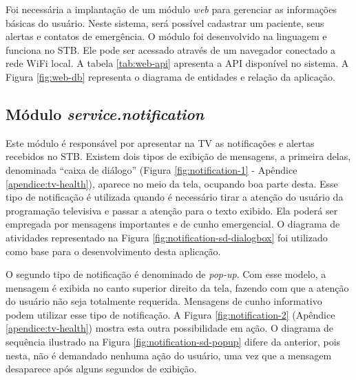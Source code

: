 Foi necessária a implantação de um módulo \textit{web} para gerenciar as 
informações básicas do usuário. Neste sistema, será possível cadastrar um 
paciente, seus alertas e contatos de emergência. O módulo \web[] foi desenvolvido
na linguagem \python[] e funciona no STB. Ele pode ser acessado através de
um navegador conectado a rede WiFi local. A tabela \ref{tab:web-api} apresenta
a API disponível no sistema. A Figura \vref{fig:web-db} representa o diagrama
de entidades e relação da aplicação.


\subsection{Módulo \textit{service.notification}}\label{subsubsec:notification}

Este módulo é responsável por apresentar na TV as notificações e alertas
recebidos no STB. Existem dois tipos de exibição de mensagens, a primeira
delas, denominada ``caixa de diálogo'' (Figura \vref{fig:notification-1} -
Apêndice \ref{apendice:tv-health}), aparece no meio da tela, ocupando boa parte
desta.  Esse tipo de notificação é utilizada quando é necessário tirar a
atenção do usuário da programação televisiva e passar a atenção para o texto
exibido.  Ela poderá ser empregada por mensagens importantes e de cunho
emergencial.  O diagrama de atividades representado na Figura
\ref{fig:notification-sd-dialogbox} foi utilizado como base para o
desenvolvimento desta aplicação.



O segundo tipo de notificação é denominado de \textit{pop-up}. Com esse modelo,
a mensagem é exibida no canto superior direito da tela, fazendo com que a
atenção do usuário não seja totalmente requerida. Mensagens de cunho informativo
podem utilizar esse tipo de notificação. A Figura \ref{fig:notification-2} 
(Apêndice \ref{apendice:tv-health}) mostra esta outra possibilidade em ação.
O diagrama de sequência ilustrado na Figura \ref{fig:notification-sd-popup}
difere da anterior, pois nesta, não é demandado nenhuma
ação do usuário, uma vez que a mensagem desaparece após alguns segundos de exibição.

